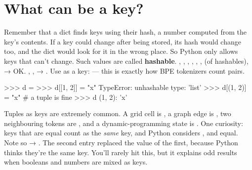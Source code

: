 \documentclass[10pt,a4paper]{article}
\begin{document}
\section{What can be a key?}
Remember that a dict finds keys using their hash, a number computed from the key’s contents. If a key could change after being stored, its hash would change too, and the dict would look for it in the wrong place. So Python only allows keys that can’t change. Such values are called \textbf{hashable}.
, , , , , ,  (of hashables),  → OK. , ,  → . Use  as a key:  — this is exactly how BPE tokenizers count pairs.
\begin{txtcode}
>>> d = {}
>>> d[[1, 2]] = "x"
TypeError: unhashable type: 'list'
>>> d[(1, 2)] = "x"          # a tuple is fine
>>> d
{(1, 2): 'x'}
\end{txtcode}
Tuples as keys are extremely common. A grid cell is , a graph edge is , two neighbouring tokens are , and a dynamic-programming state is .
One curiosity: keys that are equal count as the \emph{same} key, and Python considers ,  and  equal.
Note  so  → .
The second entry replaced the value of the first, because Python thinks they’re the same key. You’ll rarely hit this, but it explains odd results when booleans and numbers are mixed as keys.
\setcounter{section}{5}
\end{document}
